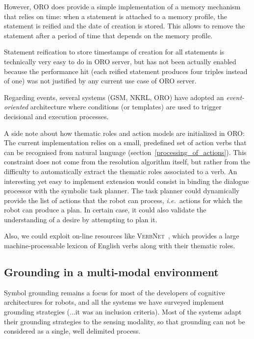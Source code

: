 \documentclass[a4paper, twocolumn]{article}
\newcommand{\ie}{{\textit{i.e.\ }}}
\begin{document}
However, ORO does provide a simple implementation of a memory mechanism that
relies on time: when a statement is attached to a memory profile, the statement
is reified and the date of creation is stored. This allows to remove the
statement after a period of time that depends on the memory profile.

Statement reification to store timestamps of creation for all statements is
technically very easy to do in ORO server, but has not been actually enabled
because the performance hit (each reified statement produces four triples
instead of one) was not justified by any current use case of ORO server.

Regarding events, several systems (GSM, NKRL, ORO) have adopted an {\em
event-oriented} architecture where conditions (or templates) are used to
trigger decisional and execution processes.

A side note about how thematic roles and action models are initialized in ORO:
The current implementation relies on a small, predefined set of action verbs
that can be recognised from natural language
(section~\ref{processing_of_actions}).  This constraint does not come from the
resolution algorithm itself, but rather from the difficulty to automatically
extract the thematic roles associated to a verb. An interesting yet easy to
implement extension would consist in binding the dialogue processor with the
symbolic task planner. The task planner could dynamically provide the list of
actions that the robot can process, \ie actions for which the robot can produce
a plan. In certain case, it could also validate the understanding of a desire
by attempting to plan it.

Also, we could exploit on-line resources like
\textsc{VerbNet}~\cite{Kipper2008}, which provides a large machine-processable
lexicon of English verbs along with their thematic roles.


\subsection{Grounding in a multi-modal environment}

Symbol grounding remains a focus for most of the developers of cognitive
architectures for robots, and all the systems we have surveyed implement
grounding strategies (...it was an inclusion criteria). Most of the systems
adapt their grounding strategies to the sensing modality, so that grounding can
not be considered as a single, well delimited process.
\end{document}
